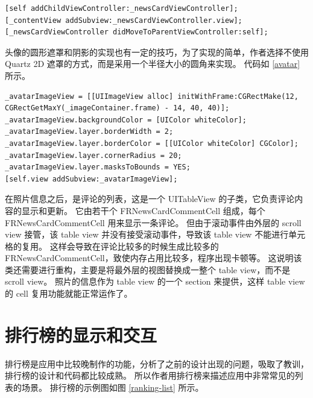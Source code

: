 \begin{minipage}{\textwidth}
\begin{lstlisting}[caption=嵌套 view controller, label=nested-view-controller]
[self addChildViewController:_newsCardViewController];
[_contentView addSubview:_newsCardViewController.view];
[_newsCardViewController didMoveToParentViewController:self];
\end{lstlisting}
\end{minipage}

头像的圆形遮罩和阴影的实现也有一定的技巧，为了实现的简单，作者选择不使用 Quartz 2D 遮罩的方式，而是采用一个半径大小的圆角来实现。
代码如 \ref{avatar} 所示。

\begin{minipage}{\textwidth}
\begin{lstlisting}[caption=头像的阴影和遮罩的实现, label=avatar]
_avatarImageView = [[UIImageView alloc] initWithFrame:CGRectMake(12, CGRectGetMaxY(_imageContainer.frame) - 14, 40, 40)];
_avatarImageView.backgroundColor = [UIColor whiteColor];
_avatarImageView.layer.borderWidth = 2;
_avatarImageView.layer.borderColor = [[UIColor whiteColor] CGColor];
_avatarImageView.layer.cornerRadius = 20;
_avatarImageView.layer.masksToBounds = YES;
[self.view addSubview:_avatarImageView];
\end{lstlisting}
\end{minipage}

在照片信息之后，是评论的列表，这是一个 UITableView 的子类，它负责评论内容的显示和更新。
它由若干个 FRNewsCardCommentCell 组成，每个 FRNewsCardCommentCell 用来显示一条评论。
但由于滚动事件由外层的 scroll view 接管，该 table view 并没有接受滚动事件，导致该 table view 不能进行单元格的复用。
这样会导致在评论比较多的时候生成比较多的 FRNewsCardCommentCell，致使内存占用比较多，程序出现卡顿等。
这说明该类还需要进行重构，主要是将最外层的视图替换成一整个 table view，而不是 scroll view。
照片的信息作为 table view 的一个 section 来提供，这样 table view 的 cell 复用功能就能正常运作了。

\section{排行榜的显示和交互}

排行榜是应用中比较晚制作的功能，分析了之前的设计出现的问题，吸取了教训，排行榜的设计和代码都比较成熟。
所以作者用排行榜来描述应用中非常常见的列表的场景。
排行榜的示例图如图 \ref{ranking-list} 所示。

